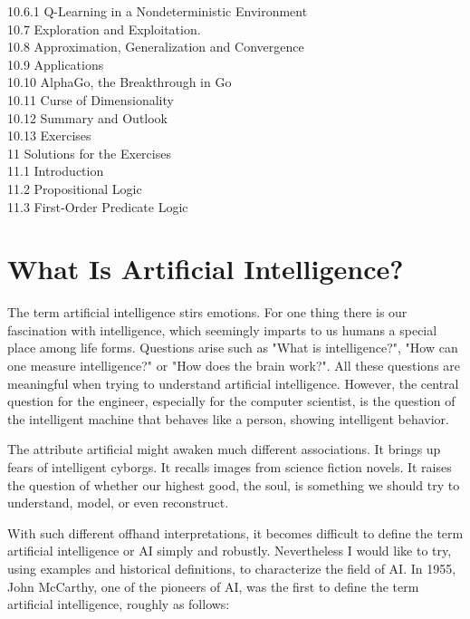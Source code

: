 \documentclass[10pt]{book}
\begin{document}
10.6.1 Q-Learning in a Nondeterministic Environment \\
10.7 Exploration and Exploitation. \\
10.8 Approximation, Generalization and Convergence \\
10.9 Applications \\
10.10 AlphaGo, the Breakthrough in Go \\
10.11 Curse of Dimensionality \\
10.12 Summary and Outlook \\
10.13 Exercises \\
11 Solutions for the Exercises \\
11.1 Introduction \\
11.2 Propositional Logic \\
11.3 First-Order Predicate Logic \\
\section{What Is Artificial Intelligence?}
The term artificial intelligence stirs emotions. For one thing there is our fascination with intelligence, which seemingly imparts to us humans a special place among life forms. Questions arise such as "What is intelligence?", "How can one measure intelligence?" or "How does the brain work?". All these questions are meaningful when trying to understand artificial intelligence. However, the central question for the engineer, especially for the computer scientist, is the question of the intelligent machine that behaves like a person, showing intelligent behavior.

The attribute artificial might awaken much different associations. It brings up fears of intelligent cyborgs. It recalls images from science fiction novels. It raises the question of whether our highest good, the soul, is something we should try to understand, model, or even reconstruct.

With such different offhand interpretations, it becomes difficult to define the term artificial intelligence or AI simply and robustly. Nevertheless I would like to try, using examples and historical definitions, to characterize the field of AI. In 1955, John McCarthy, one of the pioneers of AI, was the first to define the term artificial intelligence, roughly as follows:
\end{document}
